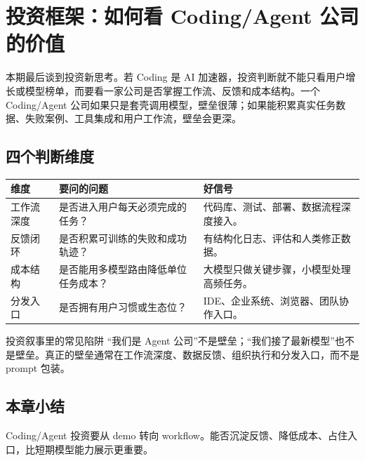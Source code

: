 \section{投资框架：如何看 Coding/Agent 公司的价值}

本期最后谈到投资新思考。若 Coding 是 AI 加速器，投资判断就不能只看用户增长或模型榜单，而要看一家公司是否掌握工作流、反馈和成本结构。一个 Coding/Agent 公司如果只是套壳调用模型，壁垒很薄；如果能积累真实任务数据、失败案例、工具集成和用户工作流，壁垒会更深。

\subsection{四个判断维度}

\noindent\begin{tabularx}{\textwidth}{p{}p{}X}
\toprule
维度 & 要问的问题 & 好信号 \\
\midrule
工作流深度 & 是否进入用户每天必须完成的任务？ & 代码库、测试、部署、数据流程深度接入。 \\
反馈闭环 & 是否积累可训练的失败和成功轨迹？ & 有结构化日志、评估和人类修正数据。 \\
成本结构 & 是否能用多模型路由降低单位任务成本？ & 大模型只做关键步骤，小模型处理高频任务。 \\
分发入口 & 是否拥有用户习惯或生态位？ & IDE、企业系统、浏览器、团队协作入口。 \\
\bottomrule
\end{tabularx}

\begin{warningbox}{投资叙事里的常见陷阱}
“我们是 Agent 公司”不是壁垒；“我们接了最新模型”也不是壁垒。真正的壁垒通常在工作流深度、数据反馈、组织执行和分发入口，而不是 prompt 包装。
\end{warningbox}

\subsection{本章小结}

Coding/Agent 投资要从 demo 转向 workflow。能否沉淀反馈、降低成本、占住入口，比短期模型能力展示更重要。

